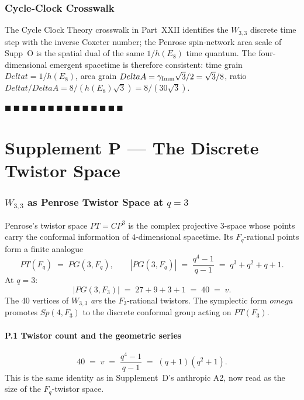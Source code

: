 \documentclass[12pt,a4paper]{article}
\def\mathbb#1{#1}%
\def\mathrm#1{#1}%
\def\omega{omega}%
\def\Delta{Delta}%
\theoremstyle{definition}
\newcommand{\PG}{\mathrm{PG}}
\newcommand{\Sp}{\mathrm{Sp}}
\newcommand{\FF}{\mathbb{F}}
\newcommand{\CC}{\mathbb{C}}
\begin{document}
\section*{Cycle-Clock Crosswalk}
The Cycle Clock Theory crosswalk in Part~XXII identifies the $W_{3,3}$
discrete time step with the inverse Coxeter number; the Penrose
spin-network area scale of Supp~O is the spatial dual of the same
$1/h(E_8)$ time quantum. The four-dimensional emergent spacetime is
therefore consistent: time grain $\Delta t = 1/h(E_8)$, area grain
$\Delta A = \gamma_{\rm Imm}\sqrt{3}/2 = \sqrt{3}/8$, ratio
$\Delta t/\Delta A = 8/(h(E_8)\sqrt{3}) = 8/(30\sqrt{3})$.

\hfill $\blacksquare\ \blacksquare\ \blacksquare\ \blacksquare\ \blacksquare\ \blacksquare\ \blacksquare\ \blacksquare\ \blacksquare\ \blacksquare\ \blacksquare\ \blacksquare\ \blacksquare\ \blacksquare$

\clearpage
\part*{Supplement P --- The Discrete Twistor Space}

\section*{$W_{3,3}$ as Penrose Twistor Space at $q=3$}

Penrose's twistor space $\mathbb{PT}=\CC P^3$ is the complex projective
3-space whose points carry the conformal information of $4$-dimensional
spacetime. Its $\FF_q$-rational points form a finite analogue
\[
\mathbb{PT}(\FF_q) \;=\; \PG(3,\FF_q),\qquad
|\PG(3,\FF_q)| \;=\; \frac{q^4-1}{q-1} \;=\; q^3+q^2+q+1.
\]
At $q=3$:
\[
\boxed{\;|\PG(3,\FF_3)| \;=\; 27+9+3+1 \;=\; 40 \;=\; v.\;}
\]
The 40 vertices of $W_{3,3}$ \emph{are} the $\FF_3$-rational twistors.
The symplectic form $\omega$ promotes $\Sp(4,\FF_3)$ to the discrete
conformal group acting on $\mathbb{PT}(\FF_3)$.

\subsection*{P.1 \quad Twistor count and the geometric series}
\[
40 \;=\; v \;=\; \frac{q^4-1}{q-1} \;=\; (q+1)(q^2+1).
\]
This is the same identity as in Supplement~D's anthropic A2, now read
as the size of the $\FF_q$-twistor space.
\end{document}
